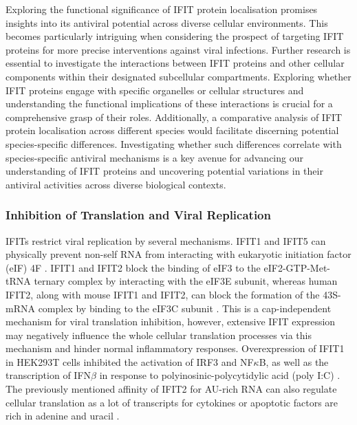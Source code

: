 Exploring the functional significance of IFIT protein localisation promises insights into its antiviral potential across diverse cellular environments. This becomes particularly intriguing when considering the prospect of targeting IFIT proteins for more precise interventions against viral infections. Further research is essential to investigate the interactions between IFIT proteins and other cellular components within their designated subcellular compartments. Exploring whether IFIT proteins engage with specific organelles or cellular structures and understanding the functional implications of these interactions is crucial for a comprehensive grasp of their roles. Additionally, a comparative analysis of IFIT protein localisation across different species would facilitate discerning potential species-specific differences. Investigating whether such differences correlate with species-specific antiviral mechanisms is a key avenue for advancing our understanding of IFIT proteins and uncovering potential variations in their antiviral activities across diverse biological contexts.

\subsubsection{Inhibition of Translation and Viral Replication} \label{Inhibition of Translation and Viral Replication}
IFITs restrict viral replication by several mechanisms. IFIT1 and IFIT5 can physically prevent non-self RNA from interacting with eukaryotic initiation factor (eIF) 4F \cite{Kumar2014InhibitionMRNAs}. IFIT1 and IFIT2 block the binding of eIF3 to the eIF2-GTP-Met-tRNA ternary complex by interacting with the eIF3E subunit, whereas human IFIT2, along with mouse IFIT1 and IFIT2, can block the formation of the 43S-mRNA complex by binding to the eIF3C subunit \cite{Diamond2014IFIT1:Translation, Guo2000CharacterizationVirus}. This is a cap-independent mechanism for viral translation inhibition, however, extensive IFIT expression may negatively influence the whole cellular translation processes via this mechanism and hinder normal inflammatory responses. Overexpression of IFIT1 in HEK293T cells inhibited the activation of IRF3 and NF\(\kappa\)B, as well as the transcription of IFN\(\beta\) in response to polyinosinic-polycytidylic acid (poly I:C) \cite{Li2009ISG56Response}. The previously mentioned affinity of IFIT2 for AU-rich RNA can also regulate cellular translation as a lot of transcripts for cytokines or apoptotic factors are rich in adenine and uracil \cite{Palanisamy2012ControlMicroRNAs}. 

